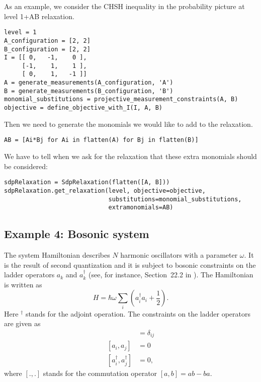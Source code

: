 \documentclass{article}
\begin{document}
As an example, we consider the CHSH inequality in the probability picture at level 1+AB relaxation.
\begin{verbatim}
level = 1
A_configuration = [2, 2]
B_configuration = [2, 2]
I = [[ 0,   -1,    0 ],
     [-1,    1,    1 ], 
     [ 0,    1,   -1 ]]
A = generate_measurements(A_configuration, 'A')
B = generate_measurements(B_configuration, 'B')
monomial_substitutions = projective_measurement_constraints(A, B)
objective = define_objective_with_I(I, A, B)
\end{verbatim}
Then we need to generate the monomials we would like to add to the relaxation.
\begin{verbatim}
AB = [Ai*Bj for Ai in flatten(A) for Bj in flatten(B)]  
\end{verbatim}
We have to tell when we ask for the relaxation that these extra monomials should be considered:
\begin{verbatim}
sdpRelaxation = SdpRelaxation(flatten([A, B]))
sdpRelaxation.get_relaxation(level, objective=objective,
                             substitutions=monomial_substitutions,
                             extramonomials=AB)
\end{verbatim}

\subsection{Example 4: Bosonic system}
The system Hamiltonian describes $N$ harmonic oscillators with a parameter $\omega$. It is the result of second quantization and it is subject to bosonic constraints on the ladder operators $a_{k}$ and $a_{k}^{\dagger}$ (see, for instance, Section~22.2 in \cite{fayngold2013quantum}). The Hamiltonian is written as
\begin{equation}
  H = \hbar \omega\sum_{i}\left(a_{i}^{\dagger}a_{i}+\frac{1}{2}\right).
\end{equation}
Here $^{\dagger}$ stands for the adjoint operation. The constraints on the ladder operators are given as
\begin{align}
[a_{i},a_{j}^{\dagger}] &=  \delta_{ij} \\
[a_{i},a_{j}]  &=  0 \nonumber \\
[a_{i}^{\dagger},a_{j}^{\dagger}] &=  0,\nonumber
\end{align}
where $[.,.]$ stands for the commutation operator $[a,b]=ab-ba$. 
\end{document}
